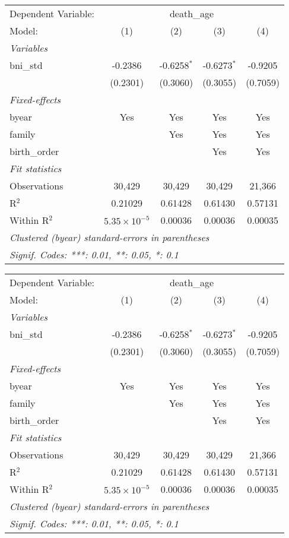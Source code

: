 \begin{tabular}{lcccc}
\tabularnewline\midrule\midrule
Dependent Variable: & \multicolumn{4}{c}{death\_age}\\
Model: & (1) & (2) & (3) & (4)\\
\midrule \emph{Variables} &   &   &   &  \\
bni\_std & -0.2386 & -0.6258$^{*}$ & -0.6273$^{*}$ & -0.9205\\
  & (0.2301) & (0.3060) & (0.3055) & (0.7059)\\
\midrule \emph{Fixed-effects} &   &   &   &  \\
byear & Yes & Yes & Yes & Yes\\
family &  & Yes & Yes & Yes\\
birth\_order &  &  & Yes & Yes\\
\midrule \emph{Fit statistics} &   &   &   &  \\
Observations & 30,429 & 30,429 & 30,429 & 21,366\\
R$^2$ & 0.21029 & 0.61428 & 0.61430 & 0.57131\\
Within R$^2$ & $5.35\times 10^{-5}$ & 0.00036 & 0.00036 & 0.00035\\
\midrule\midrule\multicolumn{5}{l}{\emph{Clustered (byear) standard-errors in parentheses}}\\
\multicolumn{5}{l}{\emph{Signif. Codes: ***: 0.01, **: 0.05, *: 0.1}}\\
\end{tabular}



\begin{tabular}{lcccc}
\tabularnewline\midrule\midrule
Dependent Variable: & \multicolumn{4}{c}{death\_age}\\
Model: & (1) & (2) & (3) & (4)\\
\midrule \emph{Variables} &   &   &   &  \\
bni\_std & -0.2386 & -0.6258$^{*}$ & -0.6273$^{*}$ & -0.9205\\
  & (0.2301) & (0.3060) & (0.3055) & (0.7059)\\
\midrule \emph{Fixed-effects} &   &   &   &  \\
byear & Yes & Yes & Yes & Yes\\
family &  & Yes & Yes & Yes\\
birth\_order &  &  & Yes & Yes\\
\midrule \emph{Fit statistics} &   &   &   &  \\
Observations & 30,429 & 30,429 & 30,429 & 21,366\\
R$^2$ & 0.21029 & 0.61428 & 0.61430 & 0.57131\\
Within R$^2$ & $5.35\times 10^{-5}$ & 0.00036 & 0.00036 & 0.00035\\
\midrule\midrule\multicolumn{5}{l}{\emph{Clustered (byear) standard-errors in parentheses}}\\
\multicolumn{5}{l}{\emph{Signif. Codes: ***: 0.01, **: 0.05, *: 0.1}}\\
\end{tabular}



